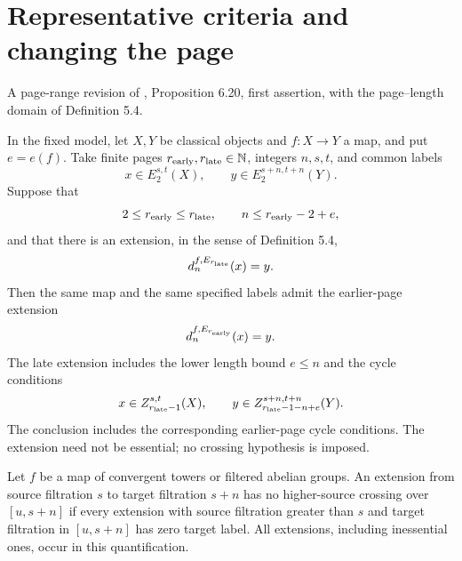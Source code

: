 \section{Representative criteria and changing the page}

\begin{theorem}
\label{sem:ProofTools:finite-extension-descent}
A page-range revision of \cite{LWX126}, Proposition 6.20, first assertion, with the page--length domain of Definition 5.4.\par

In the fixed model, let $X,Y$ be classical objects and $f:X\to Y$ a map, and put $e=e(f)$. Take finite pages $r_{\rm early},r_{\rm late}\in\mathbb N$, integers $n,s,t$, and common labels
\[
x\in E_2^{s,t}(X),\qquad y\in E_2^{s+n,t+n}(Y).
\]
Suppose that
\[
2\leq r_{\rm early}\leq r_{\rm late},\qquad
n\leq r_{\rm early}-2+e,
\]
and that there is an extension, in the sense of Definition 5.4,
\[
d_n^{f,E_{r_{\rm late}}}(x)=y.
\]
Then the same map and the same specified labels admit the earlier-page extension
\[
d_n^{f,E_{r_{\rm early}}}(x)=y.
\]
The late extension includes the lower length bound $e\leq n$ and the cycle conditions
\[
x\in Z_{r_{\rm late}-1}^{s,t}(X),\qquad
y\in Z_{r_{\rm late}-1-n+e}^{s+n,t+n}(Y).
\]
The conclusion includes the corresponding earlier-page cycle conditions. The extension need not be essential; no crossing hypothesis is imposed.
\end{theorem}


\begin{definition}
\label{sem:ProofTools:crossing-ranges}
Let $f$ be a map of convergent towers or filtered abelian groups. An extension from source filtration $s$ to target filtration $s+n$ has no higher-source crossing over $[u,s+n]$ if every extension with source filtration greater than $s$ and target filtration in $[u,s+n]$ has zero target label. All extensions, including inessential ones, occur in this quantification.
\end{definition}


